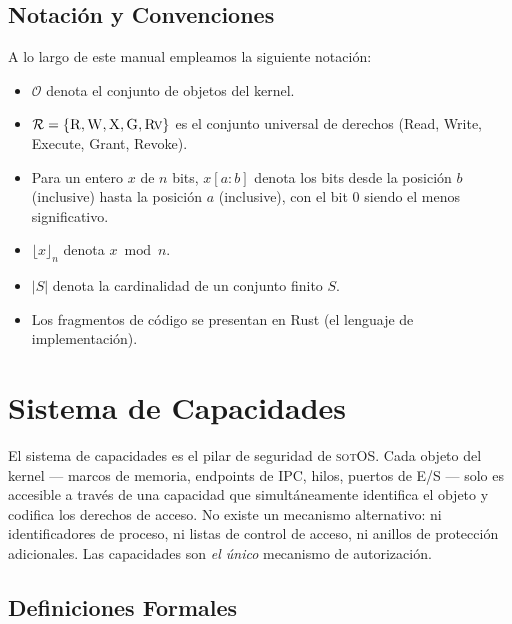 \documentclass[11pt,twoside,openright]{book}
\theoremstyle{definition}
\theoremstyle{plain}
\theoremstyle{remark}
\newcommand{\sotos}{\textsc{sotOS}}
\newcommand{\rights}{\mathcal{R}}
\begin{document}
\section{Notación y Convenciones}

A lo largo de este manual empleamos la siguiente notación:

\begin{itemize}
    \item $\mathcal{O}$ denota el conjunto de objetos del kernel.
    \item $\rights = \{\textsc{R}, \textsc{W}, \textsc{X}, \textsc{G}, \textsc{Rv}\}$ es el
          conjunto universal de derechos (Read, Write, Execute, Grant, Revoke).
    \item Para un entero $x$ de $n$ bits, $x[a{:}b]$ denota los bits desde la posición $b$
          (inclusive) hasta la posición $a$ (inclusive), con el bit 0 siendo el menos significativo.
    \item $\lfloor x \rfloor_n$ denota $x \bmod n$.
    \item $|S|$ denota la cardinalidad de un conjunto finito $S$.
    \item Los fragmentos de código se presentan en Rust (el lenguaje de implementación).
\end{itemize}


\chapter{Sistema de Capacidades}
\label{chap:capabilities}

El sistema de capacidades es el pilar de seguridad de \sotos{}. Cada objeto del kernel ---
marcos de memoria, endpoints de IPC, hilos, puertos de E/S --- solo es accesible a través
de una capacidad que simultáneamente identifica el objeto y codifica los derechos de acceso.
No existe un mecanismo alternativo: ni identificadores de proceso, ni listas de control de
acceso, ni anillos de protección adicionales. Las capacidades son \emph{el único} mecanismo
de autorización.

\section{Definiciones Formales}
\end{document}
